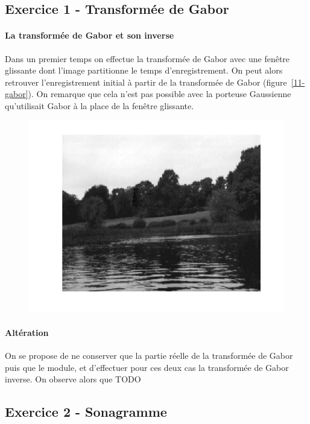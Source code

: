 \documentclass{article}
\begin{document}
\subsection{Exercice 1 - Transformée de Gabor}
\paragraph{La transformée de Gabor et son inverse}
Dans un premier temps on effectue la transformée de Gabor avec une fenêtre glissante dont l'image partitionne le temps d'enregistrement. On peut alors retrouver l'enregistrement initial à partir de la transformée de Gabor (figure~\ref{11-gabor}). On remarque que cela n'est pas possible avec la porteuse Gaussienne qu'utilisait Gabor à la place de la fenêtre glissante.

\begin{figure}[!ht]
\includegraphics[width=\textwidth]{images/1/1-1-autumn_b.png}
\end{figure}

\paragraph{Altération}
On se propose de ne conserver que la partie réelle de la transformée de Gabor puis que le module, et d'effectuer pour ces deux cas la transformée de Gabor inverse. On observe alors que TODO

\subsection{Exercice 2 - Sonagramme}
\end{document}
